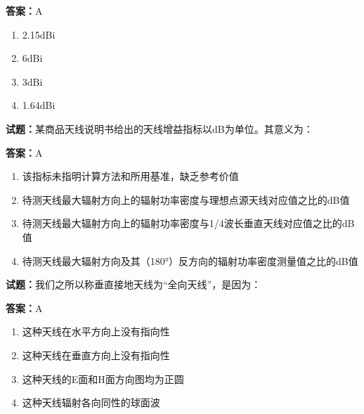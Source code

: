 \documentclass{ctexbook}
\begin{document}
\textbf{答案：}A 

\begin{enumerate}[leftmargin=3em]
  \item 2.15dBi 

  \item 6dBi 

  \item 3dBi 

  \item 1.64dBi 

\end{enumerate}





\vspace{1em}

\textbf{试题：}某商品天线说明书给出的天线增益指标以dB为单位。其意义为： 

\textbf{答案：}A 

\begin{enumerate}[leftmargin=3em]
  \item 该指标未指明计算方法和所用基准，缺乏参考价值 

  \item 待测天线最大辐射方向上的辐射功率密度与理想点源天线对应值之比的dB值 

  \item 待测天线最大辐射方向上的辐射功率密度与1/4波长垂直天线对应值之比的dB值 


  \item 待测天线最大辐射方向及其（180°）反方向的辐射功率密度测量值之比的dB值 

\end{enumerate}





\vspace{1em}

\textbf{试题：}我们之所以称垂直接地天线为“全向天线”，是因为： 

\textbf{答案：}A 

\begin{enumerate}[leftmargin=3em]
  \item 这种天线在水平方向上没有指向性 

  \item 这种天线在垂直方向上没有指向性 

  \item 这种天线的E面和H面方向图均为正圆 

  \item 这种天线辐射各向同性的球面波 

\end{enumerate}
\end{document}
